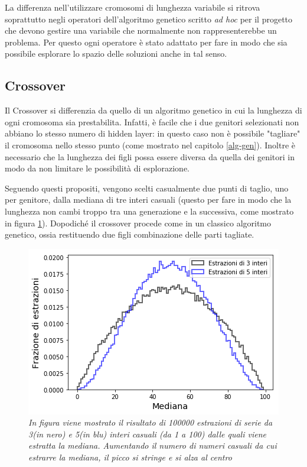 \documentclass[12pt,a4paper]{report}
\begin{document}
La differenza nell'utilizzare cromosomi di lunghezza variabile si ritrova soprattutto negli operatori dell'algoritmo genetico scritto \textit{ad hoc} per il progetto che devono gestire una variabile che normalmente non rappresenterebbe un problema. 
Per questo ogni operatore è stato adattato per fare in modo che sia possibile esplorare lo spazio delle soluzioni anche in tal senso.

\subsection{Crossover}

Il Crossover si differenzia da quello di un algoritmo genetico in cui la lunghezza di ogni cromosoma sia prestabilita. 
Infatti, è facile che i due genitori selezionati non abbiano lo stesso numero di hidden layer: in questo caso non è possibile "tagliare" il cromosoma nello stesso punto (come mostrato nel capitolo \ref{alg-gen}).
Inoltre è necessario che la lunghezza dei figli possa essere diversa da quella dei genitori in modo da non limitare le possibilità di esplorazione.

Seguendo questi propositi, vengono scelti casualmente due punti di taglio, uno per genitore, dalla mediana di tre interi casuali (questo per fare in modo che la lunghezza non cambi troppo tra una generazione e la successiva, come mostrato in figura \ref{median}).
Dopodiché il crossover procede come in un classico algoritmo genetico, ossia restituendo due figli combinazione delle parti tagliate.

\begin{figure}[H]
 \centering
 \includegraphics[scale = 0.7]{images/median-3-5}
 \caption{\textit{In figura viene mostrato il risultato di 100000 estrazioni di serie da 3(in nero) e 5(in blu) interi casuali (da 1 a 100) dalle quali viene estratta la mediana. Aumentando il numero di numeri casuali da cui estrarre la mediana, il picco si stringe e si alza al centro}}
 \label{median}
\end{figure}
\end{document}
